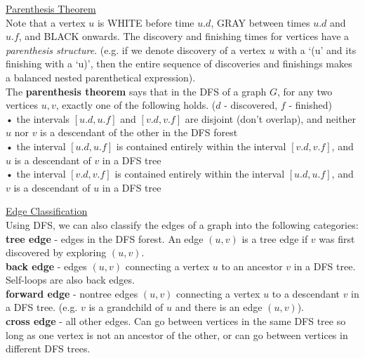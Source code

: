 \documentclass[12pt, fleqn]{general}
\begin{document}
\begin{multicols*}{2}
    \underline{Parenthesis Theorem}\\
    
    Note that a vertex $u$ is WHITE before time $u.d$, GRAY between times $u.d$ and $u.f$, and BLACK onwards. The discovery and finishing times for vertices have a \emph{parenthesis structure}. (e.g. if we denote discovery of a vertex $u$ with a `(u' and its finishing with a `u)', then the entire sequence of discoveries and finishings makes a balanced nested parenthetical expression).\\

    The \textbf{parenthesis theorem} says that in the DFS of a graph $G$, for any two vertices $u, v$, exactly one of the following holds. ($d$ - discovered, $f$ - finished)\\

    • the intervals $[u.d, u.f]$ and $[v.d, v.f]$ are disjoint (don't overlap), and neither $u$ nor $v$ is a descendant of the other in the DFS forest\\
    • the interval $[u.d, u.f]$ is contained entirely within the interval $[v.d, v.f]$, and $u$ is a descendant of $v$ in a DFS tree\\
    • the interval $[v.d, v.f]$ is contained entirely within the interval $[u.d, u.f]$, and $v$ is a descendant of $u$ in a DFS tree

    \underline{Edge Classification}\\

    Using DFS, we can also classify the edges of a graph into the following categories:\\

    \textbf{tree edge} - edges in the DFS forest. An edge $(u, v)$ is a tree edge if $v$ was first discovered by exploring $(u, v)$.\\

    \textbf{back edge} - edges $(u, v)$ connecting a vertex $u$ to an ancestor $v$ in a DFS tree. Self-loops are also back edges.\\

    \textbf{forward edge} - nontree edges $(u, v)$ connecting a vertex $u$ to a descendant $v$ in a DFS tree. (e.g. $v$ is a grandchild of $u$ and there is an edge $(u, v)$).\\

    \textbf{cross edge} - all other edges. Can go between vertices in the same DFS tree so long as one vertex is not an ancestor of the other, or can go between vertices in different DFS trees.\\


\end{multicols*}
\end{document}
